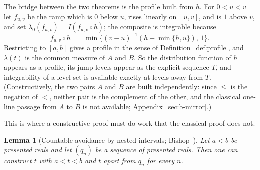 \documentclass[11pt]{article}
\newtheorem{lemma}[theorem]{Lemma}
\theoremstyle{definition}
\theoremstyle{remark}
\begin{document}
The bridge between the two theorems is the profile built from $h$.  For $0<u<v$ let $f_{u,v}$ be the ramp which is $0$ below $u$, rises linearly on $[u,v]$, and is $1$ above $v$, and set $\lambda_0(f_{u,v})=I(f_{u,v}\circ h)$; the composite is integrable because
\[
f_{u,v}\circ h \;=\; \min\{(v-u)^{-1}(h-\min\{h,u\}),\,1\}.
\]
Restricting to $[a,b]$ gives a profile in the sense of Definition~\ref{def:profile}, and $\overline{\lambda}(t)$ is the common measure of $A$ and $B$.  So the distribution function of $h$ appears as a profile, its jump levels appear as the explicit sequence $T$, and integrability of a level set is available exactly at levels away from $T$.  (Constructively, the two pairs $A$ and $B$ are built independently: since $\le$ is the negation of $<$, neither pair is the complement of the other, and the classical one-line passage from $A$ to $B$ is not available; Appendix~\ref{sec:b-mirror}.)

This is where a constructive proof must do work that the classical proof does not.

\begin{lemma}[Countable avoidance by nested intervals; Bishop~{\cite[Ch.~2, Theorem~1]{bishop-1967}}]
\label{lem:avoid}
Let $a<b$ be presented reals and let $(q_n)$ be a sequence of presented reals.  Then one can construct $t$ with $a<t<b$ and $t$ apart from $q_n$ for every $n$.
\end{lemma}
\end{document}
